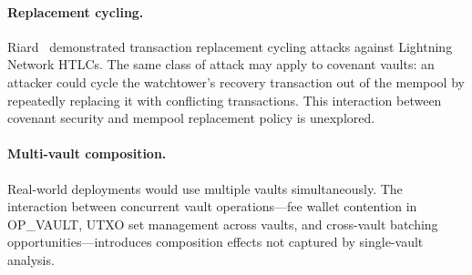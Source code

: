 \paragraph{Replacement cycling.}
Riard~\cite{Ria23} demonstrated transaction replacement cycling attacks against
Lightning Network HTLCs. The same class of attack may apply to covenant vaults:
an attacker could cycle the watchtower's recovery transaction out of the mempool
by repeatedly replacing it with conflicting transactions. This interaction between
covenant security and mempool replacement policy is unexplored.

\paragraph{Multi-vault composition.}
Real-world deployments would use multiple vaults simultaneously. The interaction
between concurrent vault operations---fee wallet contention in OP\_VAULT, UTXO set
management across vaults, and cross-vault batching opportunities---introduces
composition effects not captured by single-vault analysis.
